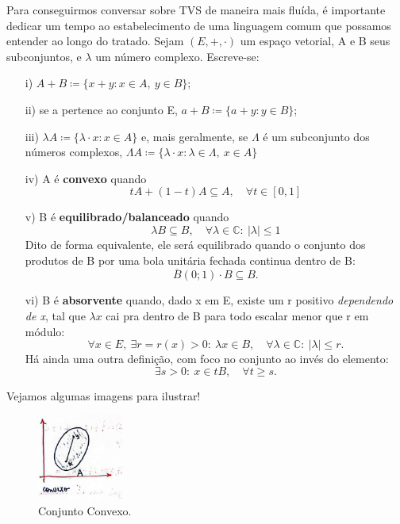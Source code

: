 \documentclass[../distribution_theory_notes.tex]{subfiles}
\begin{document}
Para conseguirmos conversar sobre TVS de maneira mais fluída, é importante dedicar um tempo ao estabelecimento de uma linguagem comum que possamos entender ao longo do tratado. Sejam \((E, +, \cdot )\) um espaço vetorial, A e B seus subconjuntos, e \(\lambda \) um número complexo. Escreve-se:
\begin{itemize}
	\item[i)] \( A+B\coloneqq \{x + y:x\in A,\: y\in B\}\);
	\item[ii)] se a pertence ao conjunto E, \(a+B\coloneqq \{a + y:y\in B\}\);
	\item[iii)] \(\lambda A \coloneqq \{\lambda \cdot x: x\in A\}\) e, mais geralmente, se \(\Lambda\) é um subconjunto dos números complexos, \(\Lambda A \coloneqq \{\lambda \cdot x: \lambda \in \Lambda,\:x\in A \}\)
	\item[iv)] A é \textbf{convexo} quando
	      \[
		      tA + (1-t)A\subseteq A,\quad \forall t\in [0, 1]
	      \]
	\item[v)] B é \textbf{equilibrado/balanceado} quando
	      \[
		      \lambda B \subseteq B,\quad \forall \lambda \in \mathbb{C}:\:|\lambda |\leq 1
	      \]
	      Dito de forma equivalente, ele será equilibrado quando o conjunto dos produtos de B por uma bola unitária fechada continua dentro de B:
	      \[
		      \overline{B}(0;1)\cdot B\subseteq B.
	      \]
	\item[vi)] B é \textbf{absorvente} quando, dado x em E, existe um r positivo \textit{dependendo de x}, tal que \(\lambda x\) cai pra dentro de B para todo escalar menor que r em módulo:
	      \[
		      \forall x\in E,\: \exists r=r(x)>0: \:\lambda x\in B,\quad \forall \lambda \in \mathbb{C}:\:|\lambda |\leq r.
	      \]
	      Há ainda uma outra definição, com foco no conjunto ao invés do elemento:
	      \[
		      \exists s > 0:\: x\in tB,\quad \forall t \geq s.
	      \]
\end{itemize}
Vejamos algumas imagens para ilustrar!
\begin{figure}[H]
	\begin{center}
		\includegraphics[height=0.25\textheight, width=0.25\textwidth, keepaspectratio]{./Images/convex.png}
	\end{center}
	\caption{Conjunto Convexo.}
	\label{conv1}
\end{figure}
\end{document}
